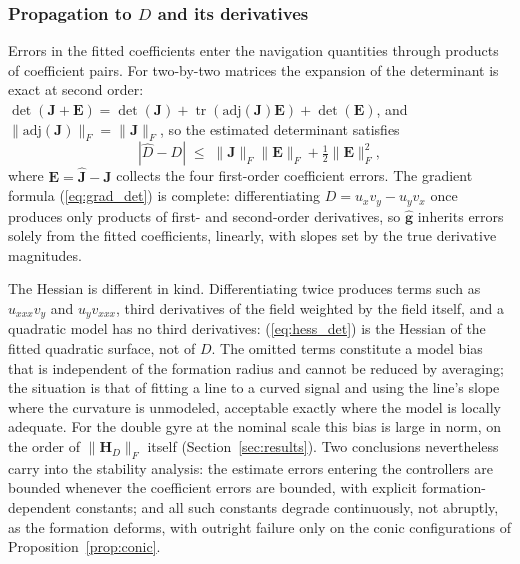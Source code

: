 \documentclass[lettersize,journal]{IEEEtran}
\begin{document}
\subsubsection{Propagation to $D$ and its derivatives}
Errors in the fitted coefficients enter the navigation quantities through
products of coefficient pairs. For two-by-two matrices the expansion of
the determinant is exact at second order:
$\det(\mathbf{J} + \mathbf{E}) = \det(\mathbf{J}) +
\operatorname{tr}(\mathrm{adj}(\mathbf{J})\mathbf{E}) + \det(\mathbf{E})$,
and $\|\mathrm{adj}(\mathbf{J})\|_F = \|\mathbf{J}\|_F$, so the estimated
determinant satisfies
\begin{equation}
    |\hat{D} - D| \;\leq\; \|\mathbf{J}\|_F \|\mathbf{E}\|_F
    + \tfrac{1}{2}\|\mathbf{E}\|_F^2,
    \label{eq:det_perturbation}
\end{equation}
where $\mathbf{E} = \hat{\mathbf{J}} - \mathbf{J}$ collects the four
first-order coefficient errors. The gradient formula (\ref{eq:grad_det})
is complete: differentiating $D = u_x v_y - u_y v_x$ once produces only
products of first- and second-order derivatives, so $\hat{\mathbf{g}}$
inherits errors solely from the fitted coefficients, linearly, with
slopes set by the true derivative magnitudes.

The Hessian is different in kind. Differentiating twice produces terms
such as $u_{xxx} v_y$ and $u_y v_{xxx}$, third derivatives of the field
weighted by the field itself, and a quadratic model has no third
derivatives: (\ref{eq:hess_det}) is the Hessian of the fitted quadratic
surface, not of $D$. The omitted terms constitute a model bias that is
independent of the formation radius and cannot be reduced by averaging;
the situation is that of fitting a line to a curved signal and using the
line's slope where the curvature is unmodeled, acceptable exactly where
the model is locally adequate. For the double gyre at the nominal scale
this bias is large in norm, on the order of $\|\mathbf{H}_D\|_F$ itself
(Section~\ref{sec:results}). Two conclusions nevertheless carry into the
stability analysis: the estimate errors entering the controllers are
bounded whenever the coefficient errors are bounded, with explicit
formation-dependent constants; and all such constants degrade
continuously, not abruptly, as the formation deforms, with outright
failure only on the conic configurations of
Proposition~\ref{prop:conic}.
\end{document}
